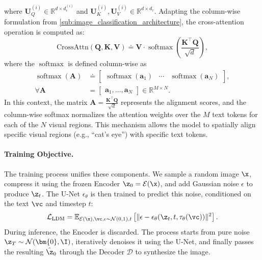 \documentclass[../../book-main.tex]{subfiles}
\begin{document}
\begin{itemize}
    where $\boldsymbol{U}^{(i)}_{Q} \in \mathbb{R}^{d \times
    d_\epsilon^{(i)}}$ and $\boldsymbol{U}^{(i)}_{K},
    \boldsymbol{U}^{(i)}_{V} \in \mathbb{R}^{d \times d_\tau}$.
    Adapting the column-wise formulation from
    \eqref{sub:image_classification_architecture}, the
    cross-attention operation is computed as:
    \begin{equation}
        \text{CrossAttn}(\boldsymbol{Q}, \boldsymbol{K},
        \boldsymbol{V}) \doteq \boldsymbol{V} \cdot
        \operatorname{softmax}\left( \frac{\boldsymbol{K}^\top
        \boldsymbol{Q}}{\sqrt{d}} \right),
    \end{equation}
    where the $\operatorname{softmax}$ is defined column-wise as
    \begin{align}
        \operatorname{softmax}(\boldsymbol{A})
        &\doteq
        \begin{bmatrix} \operatorname{softmax}(\boldsymbol{a}_{1}) &
            \cdots & \operatorname{softmax}(\boldsymbol{a}_{N})
        \end{bmatrix}, \\
        \forall \boldsymbol{A}
        &=
        \begin{bmatrix} \boldsymbol{a}_{1}, \dots, \boldsymbol{a}_{N}
        \end{bmatrix} \in \mathbb{R}^{M \times N}.
    \end{align}
    In this context, the matrix $\boldsymbol{A} =
    \frac{\boldsymbol{K}^\top \boldsymbol{Q}}{\sqrt{d}}$ represents
    the alignment scores, and the column-wise softmax normalizes the
    attention weights over the $M$ text tokens for each of the $N$
    visual regions. This mechanism allows the model to spatially
    align specific visual regions (e.g., ``cat's eye'') with specific
    text tokens.
\end{itemize}

\paragraph{Training Objective.}
The training process unifies these components. We sample a random
image $\x$, compress it using the frozen Encoder $\z_0 =
\mathcal{E}(\x)$, and add Gaussian noise $\epsilon$ to produce
$\z_t$. The U-Net $\epsilon_\theta$ is then trained to predict this
noise, conditioned on the text $\vc$ and timestep $t$:
\begin{equation}
\mathcal{L}_{\text{LDM}} = \mathbb{E}_{\mathcal{E}(\x), \vc, \epsilon
\sim \mathcal{N}(0,1), t} \left[ \| \epsilon - \epsilon_\theta(\z_t,
t, \tau_\theta(\vc)) \|^2 \right].
\end{equation}
During inference, the Encoder is discarded. The process starts from
pure noise $\z_T \sim \mathcal{N}(\bm{0}, \I)$, iteratively denoises
it using the U-Net, and finally passes the resulting $\hat{\z}_0$
through the Decoder $\mathcal{D}$ to synthesize the image.
\end{document}
